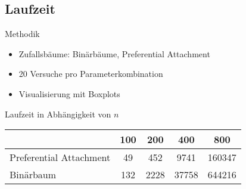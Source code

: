 \subsection{Laufzeit}
\begin{frame}{Methodik}
    \begin{itemize}[<+(1)->]
        \item Zufallsbäume: Binärbäume, Preferential Attachment
        \item 20 Versuche pro Parameterkombination
        \item Visualisierung mit Boxplots
    \end{itemize}
\end{frame}

\begin{frame}{Laufzeit in Abhängigkeit von $n$}
    \begin{table}
        \centering
        \begin{tabular}{l*{4}{c}}
            \toprule
            & 100 & 200 & 400 & 800 \\
            \midrule
            Preferential Attachment & 49 & 452 & 9741 & 160347 \\
            Binärbaum & 132 & 2228 & 37758 & 644216 \\ 
            \bottomrule
        \end{tabular}
    \end{table}
\end{frame}

